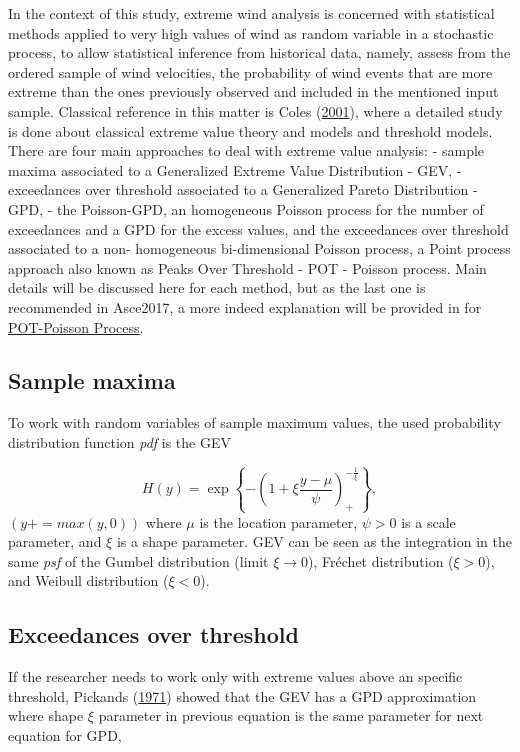 \documentclass[12pt,oneside]{reedthesis}
\begin{document}
In the context of this study, extreme wind analysis is concerned with statistical methods applied to very high values of wind as random variable in a stochastic process, to allow statistical inference from historical data, namely, assess from the ordered sample of wind velocities, the probability of wind events that are more extreme than the ones previously observed and included in the mentioned input sample. Classical reference in this matter is Coles (\protect\hyperlink{ref-Coles2001}{2001}), where a detailed study is done about classical extreme value theory and models and threshold models. There are four main approaches to deal with extreme value analysis: - sample maxima associated to a Generalized Extreme Value Distribution - GEV, - exceedances over threshold associated to a Generalized Pareto Distribution - GPD, - the Poisson-GPD, an homogeneous Poisson process for the number of exceedances and a GPD for the excess values, and the exceedances over threshold associated to a non- homogeneous bi-dimensional Poisson process, a Point process approach also known as Peaks Over Threshold - POT - Poisson process. Main details will be discussed here for each method, but as the last one is recommended in Asce2017, a more indeed explanation will be provided in for \protect\hyperlink{pot-pp}{POT-Poisson Process}.

\hypertarget{sample-maxima}{%
\subsection{Sample maxima}\label{sample-maxima}}

To work with random variables of sample maximum values, the used probability distribution function \emph{pdf} is the GEV

\[
H(y) = \exp\left\{-\left(1+\xi\frac{y-\mu}{\psi}\right)_+^{-\frac{1}{\xi}}\right\},
\]
\((y+=max(y,0))\) where \(\mu\) is the location parameter, \(\psi > 0\) is a scale parameter, and \(\xi\) is a shape parameter. GEV can be seen as the integration in the same \emph{psf} of the Gumbel distribution (limit \(\xi\rightarrow0\)), Fréchet distribution (\(\xi>0\)), and Weibull distribution (\(\xi<0\)).

\hypertarget{exceedances-over-threshold}{%
\subsection{Exceedances over threshold}\label{exceedances-over-threshold}}

If the researcher needs to work only with extreme values above an specific threshold, Pickands (\protect\hyperlink{ref-Pickands1971}{1971}) showed that the GEV has a GPD approximation where shape \(\xi\) parameter in previous equation is the same parameter for next equation for GPD,
\end{document}
